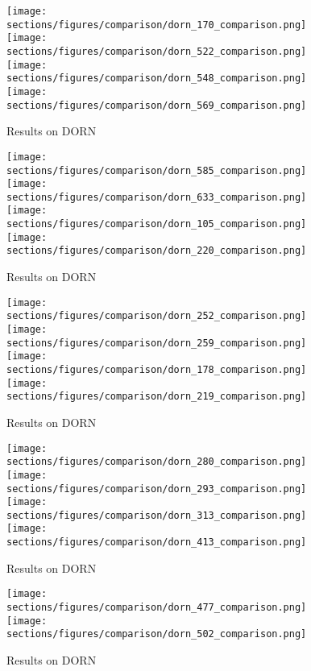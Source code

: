 \begin{figure*}
  \texttt{[image: sections/figures/comparison/dorn\_170\_comparison.png]}
  \texttt{[image: sections/figures/comparison/dorn\_522\_comparison.png]}
  \texttt{[image: sections/figures/comparison/dorn\_548\_comparison.png]}
  \texttt{[image: sections/figures/comparison/dorn\_569\_comparison.png]}
  \caption{Results on DORN}
\end{figure*}
\begin{figure*}
  \texttt{[image: sections/figures/comparison/dorn\_585\_comparison.png]}
  \texttt{[image: sections/figures/comparison/dorn\_633\_comparison.png]}
  \texttt{[image: sections/figures/comparison/dorn\_105\_comparison.png]}
  \texttt{[image: sections/figures/comparison/dorn\_220\_comparison.png]}
  \caption{Results on DORN}
\end{figure*}
\begin{figure*}
  \texttt{[image: sections/figures/comparison/dorn\_252\_comparison.png]}
  \texttt{[image: sections/figures/comparison/dorn\_259\_comparison.png]}
  \texttt{[image: sections/figures/comparison/dorn\_178\_comparison.png]}
  \texttt{[image: sections/figures/comparison/dorn\_219\_comparison.png]}
  \caption{Results on DORN}
\end{figure*}
\begin{figure*}
  \texttt{[image: sections/figures/comparison/dorn\_280\_comparison.png]}
  \texttt{[image: sections/figures/comparison/dorn\_293\_comparison.png]}
  \texttt{[image: sections/figures/comparison/dorn\_313\_comparison.png]}
  \texttt{[image: sections/figures/comparison/dorn\_413\_comparison.png]}
  \caption{Results on DORN}
\end{figure*}
\begin{figure*}
  \texttt{[image: sections/figures/comparison/dorn\_477\_comparison.png]}
  \texttt{[image: sections/figures/comparison/dorn\_502\_comparison.png]}
  \caption{Results on DORN}
\end{figure*}
% 
% 

